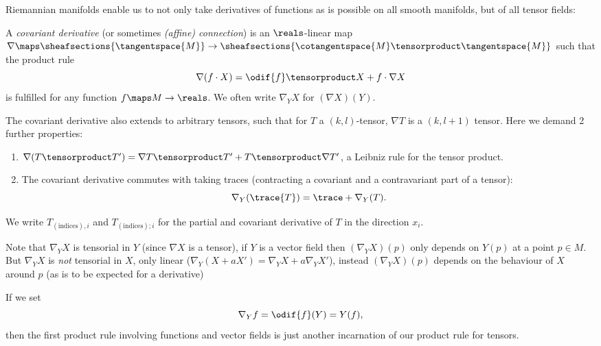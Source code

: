 \documentclass[titlepage,numbers=noenddot,headinclude,oneside,%
footinclude=true,cleardoublepage=empty,%
BCOR=5mm,paper=a4,fontsize=11pt,%
english,%
]{scrartcl}
\begin{document}
Riemannian manifolds enable us to not only take derivatives of functions as is possible on all smooth manifolds, but of all tensor fields:
\begin{definition}
    A \emph{covariant derivative} (or sometimes \emph{(affine) connection}) is an \( \reals \)-linear map \( \nabla\maps \sheafsections{\tangentspace{M}}\to \sheafsections{\cotangentspace{M}\tensorproduct \tangentspace{M}} \) such that the product rule
    \begin{equation*}
        \nabla(f\cdot X)=\odif{f}\tensorproduct X+f\cdot \nabla X
    \end{equation*}
    is fulfilled for any function \( f \maps M\to \reals\). We often write \( \nabla_Y X \) for \( (\nabla X)(Y) \).

    The covariant derivative also extends to arbitrary tensors, such that for \( T \) a \( (k,l) \)-tensor, \( \nabla T \) is a \( (k,l+1) \) tensor. Here we demand 2 further properties:
    \begin{enumerate}
        \item \( \nabla(T\tensorproduct T')=\nabla T\tensorproduct T'+T\tensorproduct \nabla T' \), \ie a Leibniz rule for the tensor product.
        \item The covariant derivative commutes with taking traces (contracting a covariant and a contravariant part of a tensor):
        \begin{equation*}
            \nabla_Y (\trace{T})=\trace+{\nabla_Y(T)}.
        \end{equation*}
    \end{enumerate}
\end{definition}
\begin{notation}    
    We write \( T_{(\text{indices}),i} \) and \( T_{(\text{indices});i} \) for the partial and covariant derivative of \( T \) in the direction \( x_i \).
\end{notation}
\begin{remark}
    Note that \( \nabla_Y X \) is tensorial in \( Y \) (since \( \nabla X \) is a tensor), \ie if \( Y  \) is a vector field then \( (\nabla_Y X)(p) \) only depends on \( Y(p) \) at a point \( p\in M \). But \( \nabla_Y X \) is \emph{not} tensorial in \( X \), only linear (\ie \( \nabla_Y (X+aX')=\nabla_Y X+ a\nabla_Y X' \)), instead \( (\nabla_Y X)(p) \) depends on the behaviour of \( X \) around \( p \) (as is to be expected for a derivative)
\end{remark}
\begin{remark}
    If we set
    \begin{equation*}
        \nabla_Y f =\odif{f}(Y)=Y(f),
    \end{equation*}
    then the first product rule involving functions and vector fields is just another incarnation of our product rule for tensors.
\end{remark}
\end{document}
